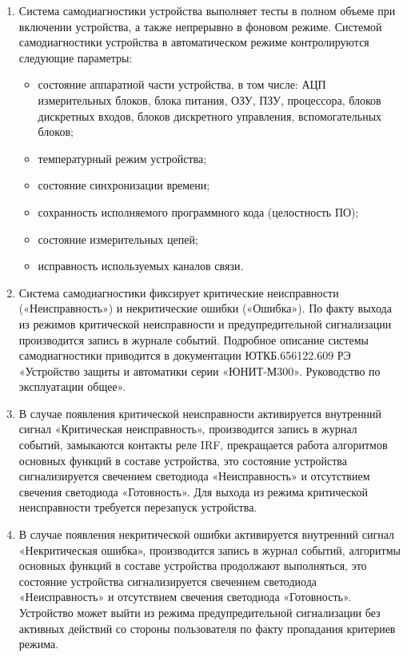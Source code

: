 \begin{enumerate}
\begin{enumerate}
\item
Система самодиагностики устройства выполняет тесты в полном объеме при включении устройства, а также непрерывно в фоновом режиме.
Системой самодиагностики устройства в автоматическом режиме контролируются следующие параметры:
\begin{itemize}
\item состояние аппаратной части устройства, в том числе: АЦП измерительных блоков, блока питания, ОЗУ, ПЗУ, процессора, блоков дискретных входов, блоков дискретного управления, вспомогательных блоков;
\item температурный режим устройства;
\item состояние синхронизации времени;
\item сохранность исполняемого программного кода (целостность ПО);
\item состояние измерительных цепей;
\item исправность используемых каналов связи.
\end{itemize}

\item
Система самодиагностики фиксирует критические неисправности («Неисправность») и некритические ошибки («Ошибка»). По факту выхода из режимов критической неисправности и предупредительной сигнализации производится запись в журнале событий. Подробное описание системы самодиагностики приводится в документации ЮТКБ.656122.609 РЭ «Устройство защиты и автоматики серии «ЮНИТ-М300». Руководство по эксплуатации общее».

\item
В случае появления критической неисправности активируется внутренний сигнал «Критическая неисправность», производится запись в журнал событий, замыкаются контакты реле IRF, прекращается работа алгоритмов основных функций в составе устройства, это состояние устройства сигнализируется свечением светодиода «Неисправность» и отсутствием свечения светодиода «Готовность». Для выхода из режима критической неисправности требуется перезапуск устройства.

\item
В случае появления некритической ошибки активируется внутренний сигнал «Некритическая ошибка», производится запись в журнал событий, алгоритмы основных функций в составе устройства продолжают выполняться, это состояние устройства сигнализируется свечением светодиода «Неисправность» и отсутствием свечения светодиода «Готовность». Устройство может выйти из режима предупредительной сигнализации без активных действий со стороны пользователя по факту пропадания критериев режима.


\end{enumerate}
\end{enumerate}
